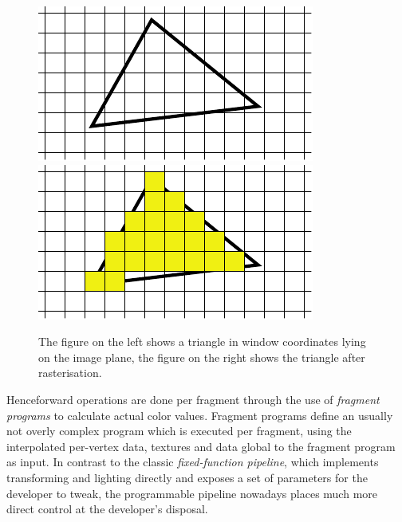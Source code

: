 \begin{figure}
\centering
\subfigure
{
  \includegraphics[scale=1.0]{Images/Rasteriser1.pdf}
  \label{fig:subfigrasteriser1}
}
\subfigure
{
  \includegraphics[scale=1.0]{Images/Rasteriser2.pdf}
  \label{fig:subfigrasteriser2}
}
\caption[Triangle Rasterisation]{The figure on the left shows a triangle in
window coordinates lying on the image plane, the figure on the right shows the
triangle after rasterisation.}
\label{fig:rasteriser}
\end{figure}

Henceforward operations are done per fragment through the use of
\textit{fragment programs} to calculate actual color values. Fragment programs
define an usually not overly complex program which is executed per fragment,
using the interpolated per-vertex data, textures and data global to the fragment
program as input. In contrast to the classic \textit{fixed-function pipeline},
which implements transforming and lighting directly and exposes a set of
parameters for the developer to tweak, the programmable pipeline nowadays places
much more direct control at the developer's disposal.

